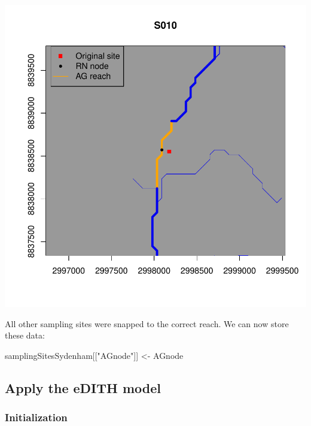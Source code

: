 \documentclass[
]{article}
\newenvironment{Shaded}{\begin{snugshade}}{\end{snugshade}}
\newcommand{\DecValTok}[1]{\textcolor[rgb]{0.00,0.00,0.81}{#1}}
\newcommand{\NormalTok}[1]{#1}
\newcommand{\OtherTok}[1]{\textcolor[rgb]{0.56,0.35,0.01}{#1}}
\newcommand{\SpecialCharTok}[1]{\textcolor[rgb]{0.81,0.36,0.00}{\textbf{#1}}}
\newcommand{\StringTok}[1]{\textcolor[rgb]{0.31,0.60,0.02}{#1}}
\begin{document}
\includegraphics{Illustrating_eDITH_files/figure-latex/unnamed-chunk-13-1.pdf}

\begin{Shaded}
\end{Shaded}

All other sampling sites were snapped to the correct reach. We can now store these data:

\begin{Shaded}
\begin{Highlighting}[]
\NormalTok{samplingSitesSydenham[[}\StringTok{"AGnode"}\NormalTok{]] }\OtherTok{\textless{}{-}}\NormalTok{ AGnode}
\end{Highlighting}
\end{Shaded}

\hypertarget{apply-the-edith-model}{%
\subsection{Apply the eDITH model}\label{apply-the-edith-model}}

\hypertarget{initialization-1}{%
\subsubsection{Initialization}\label{initialization-1}}
\end{document}

